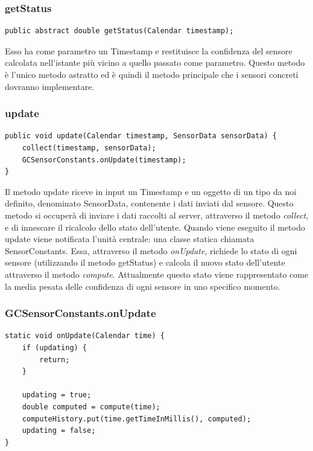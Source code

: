 \subsubsection{getStatus}
\begin{verbatim}
public abstract double getStatus(Calendar timestamp);
\end{verbatim}
Esso ha come parametro un Timestamp e restituisce la confidenza del sensore calcolata nell'istante più vicino a quello passato come parametro. Questo metodo è l'unico metodo astratto ed è quindi il metodo principale che i sensori concreti dovranno implementare.
\subsubsection{update}\label{ref:update-method}

\begin{verbatim}
public void update(Calendar timestamp, SensorData sensorData) {
    collect(timestamp, sensorData);
    GCSensorConstants.onUpdate(timestamp);
}
\end{verbatim}
Il metodo update riceve in input un Timestamp e un oggetto di un tipo da noi definito, denominato SensorData, contenente i dati inviati dal sensore. Questo metodo si occuperà di inviare i dati raccolti al server, attraverso il metodo \textit{collect}, e di innescare il ricalcolo dello stato dell'utente.
Quando viene eseguito il metodo update viene notificata l'unità centrale: una classe statica chiamata SensorConstants. Essa, attraverso il metodo \textit{onUpdate}, richiede lo stato di ogni sensore (utilizzando il metodo getStatus) e calcola il nuovo stato dell'utente attraverso il metodo \textit{compute}. Attualmente questo stato viene rappresentato come la media pesata delle confidenza di ogni sensore in uno specifico momento.

\subsubsection{GCSensorConstants.onUpdate}
\begin{verbatim}
static void onUpdate(Calendar time) {
    if (updating) {
        return;
    }

    updating = true;
    double computed = compute(time);
    computeHistory.put(time.getTimeInMillis(), computed);
    updating = false;
}
\end{verbatim}

